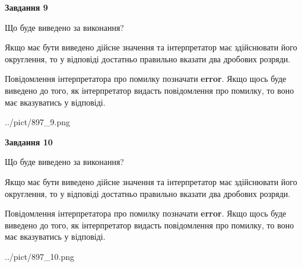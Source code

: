 \documentclass[12pt, ukrainian]{article}
\begin{document}
{\begin {Large}
{\begin {center}\textbf{Завдання 9}\end {center}}\par
Що буде виведено за виконання? \par

Якщо має бути виведено дійсне значення та інтерпретатор має здійснювати його округлення, 
то у відповіді достатньо правильно вказати два дробових розряди.

Повідомлення інтерпретатора про помилку позначати \textbf{error}.
Якщо щось буде виведено до того, як інтерпретатор видасть повідомлення про помилку, 
то воно має вказуватись у відповіді. \par

\begin{center}
	{../pict/897_9.png}
\end{center}
\newpage

{\begin {center}\textbf{Завдання 10}\end {center}}\par
Що буде виведено за виконання? \par

Якщо має бути виведено дійсне значення та інтерпретатор має здійснювати його округлення, 
то у відповіді достатньо правильно вказати два дробових розряди.

Повідомлення інтерпретатора про помилку позначати \textbf{error}.
Якщо щось буде виведено до того, як інтерпретатор видасть повідомлення про помилку, 
то воно має вказуватись у відповіді. \par

\begin{center}
	{../pict/897_10.png}
\end{center}
\newpage

\end {Large}}
\end{document}
